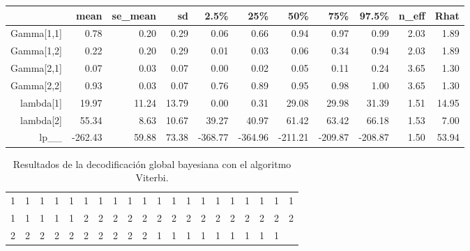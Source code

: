 \documentclass[a4paper]{article}\usepackage[]{graphicx}\usepackage[]{color}
\begin{document}
\begin{table}[ht]
\centering
\begin{tabular}{rrrrrrrrrrr}
  \hline
 & mean & se\_mean & sd & 2.5\% & 25\% & 50\% & 75\% & 97.5\% & n\_eff & Rhat \\ 
  \hline
Gamma[1,1] & 0.78 & 0.20 & 0.29 & 0.06 & 0.66 & 0.94 & 0.97 & 0.99 & 2.03 & 1.89 \\ 
  Gamma[1,2] & 0.22 & 0.20 & 0.29 & 0.01 & 0.03 & 0.06 & 0.34 & 0.94 & 2.03 & 1.89 \\ 
  Gamma[2,1] & 0.07 & 0.03 & 0.07 & 0.00 & 0.02 & 0.05 & 0.11 & 0.24 & 3.65 & 1.30 \\ 
  Gamma[2,2] & 0.93 & 0.03 & 0.07 & 0.76 & 0.89 & 0.95 & 0.98 & 1.00 & 3.65 & 1.30 \\ 
  lambda[1] & 19.97 & 11.24 & 13.79 & 0.00 & 0.31 & 29.08 & 29.98 & 31.39 & 1.51 & 14.95 \\ 
  lambda[2] & 55.34 & 8.63 & 10.67 & 39.27 & 40.97 & 61.42 & 63.42 & 66.18 & 1.53 & 7.00 \\ 
  lp\_\_ & -262.43 & 59.88 & 73.38 & -368.77 & -364.96 & -211.21 & -209.87 & -208.87 & 1.50 & 53.94 \\ 
   \hline
\end{tabular}
\end{table}


\begin{table}[ht]
\centering
\begin{tabular}{rrrrrrrrrrrrrrrrrrrr}
  \hline
  \hline
1 & 1 & 1 & 1 & 1 & 1 & 1 & 1 & 1 & 1 & 1 & 1 & 1 & 1 & 1 & 1 & 1 & 1 & 1 & 1 \\ 
  1 & 1 & 1 & 1 & 1 & 2 & 2 & 2 & 2 & 2 & 2 & 2 & 2 & 2 & 2 & 2 & 2 & 2 & 2 & 2 \\ 
  2 & 2 & 2 & 2 & 2 & 2 & 2 & 2 & 2 & 2 & 1 & 1 & 1 & 1 & 1 & 1 & 1 & 1 & 1 &  \\ 
   \hline
\end{tabular}
\caption{Resultados de la decodificación global bayesiana con el algoritmo Viterbi.} 
\end{table}
\end{document}

